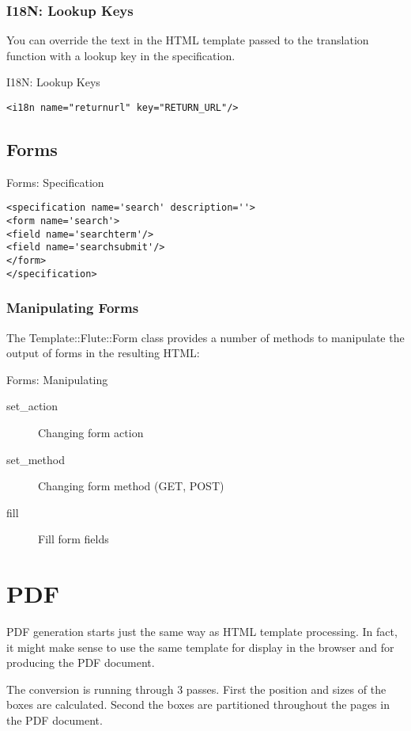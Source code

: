 \subsubsection{I18N: Lookup Keys}
You can override the text in the HTML template passed to the
translation function with a lookup key in the specification.
\begin{frame}[fragile]{I18N: Lookup Keys}
\begin{lstlisting}
<i18n name="returnurl" key="RETURN_URL"/>
\end{lstlisting}
\end{frame}

\subsection{Forms}
\begin{frame}[fragile]{Forms: Specification}
\begin{lstlisting}
<specification name='search' description=''>
<form name='search'>
<field name='searchterm'/>
<field name='searchsubmit'/>
</form>
</specification>
\end{lstlisting}
\end{frame}

\subsubsection{Manipulating Forms}
The Template::Flute::Form class provides a number of methods
to manipulate the output of forms in the resulting HTML:

\begin{frame}{Forms: Manipulating}
  \begin{description}
  \item[set\_action] Changing form action
  \item[set\_method] Changing form method (GET, POST)
  \item[fill] Fill form fields
  \end{description}
\end{frame}

\section{PDF}
PDF generation starts just the same way as HTML template
processing. In fact, it might make sense to use the same template
for display in the browser and for producing the PDF document.

The conversion is running through 3 passes. First the position
and sizes of the boxes are calculated. Second the boxes are
partitioned throughout the pages in the PDF document.

